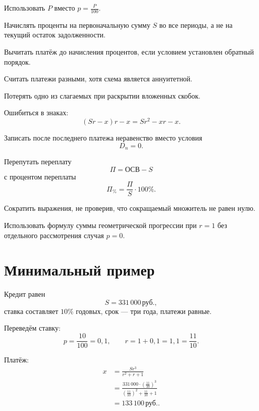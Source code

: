 \documentclass[a4paper,12pt]{article}
\newcommand{\rub}{\,\text{руб.}}
\begin{document}
\begin{checklist}
  \item Использовать \(P\) вместо
  \(\displaystyle p=\frac{P}{100}\).

  \item Начислять проценты на первоначальную сумму \(S\) во все периоды,
  а не на текущий остаток задолженности.

  \item Вычитать платёж до начисления процентов, если условием установлен
  обратный порядок.

  \item Считать платежи разными, хотя схема является аннуитетной.

  \item Потерять одно из слагаемых при раскрытии вложенных скобок.

  \item Ошибиться в знаках:
  \[
  (Sr-x)r-x=Sr^2-xr-x.
  \]

  \item Записать после последнего платежа неравенство вместо условия
  \[
  D_n=0.
  \]

  \item Перепутать переплату
  \[
  \Pi=\text{ОСВ}-S
  \]
  с процентом переплаты
  \[
  \Pi_{\%}=\frac{\Pi}{S}\cdot100\%.
  \]

  \item Сократить выражения, не проверив, что сокращаемый множитель
  не равен нулю.

  \item Использовать формулу суммы геометрической прогрессии при \(r=1\)
  без отдельного рассмотрения случая \(p=0\).
\end{checklist}

\section{Минимальный пример}

Кредит равен
\[
S=331\,000\rub,
\]
ставка составляет \(10\%\) годовых, срок --- три года, платежи равные.

Переведём ставку:
\[
p=\frac{10}{100}=0{,}1,
\qquad
r=1+0{,}1=1{,}1=\frac{11}{10}.
\]

Платёж:
\begin{align*}
x
&=
\frac{Sr^3}{r^2+r+1}\\
&=
\frac{
331\,000\cdot\left(\frac{11}{10}\right)^3
}{
\left(\frac{11}{10}\right)^2+
\frac{11}{10}+1
}\\
&=
133\,100\rub.
\end{align*}
\end{document}
